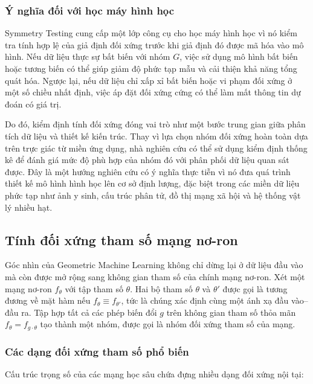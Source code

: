 \subsubsection{Ý nghĩa đối với học máy hình học}

Symmetry Testing cung cấp một lớp công cụ cho học máy hình học vì nó kiểm tra tính hợp lệ của giả định đối xứng trước khi giả định đó được mã hóa vào mô hình. Nếu dữ liệu thực sự bất biến với nhóm $G$, việc sử dụng mô hình bất biến hoặc tương biến có thể giúp giảm độ phức tạp mẫu và cải thiện khả năng tổng quát hóa. Ngược lại, nếu dữ liệu chỉ xấp xỉ bất biến hoặc vi phạm đối xứng ở một số chiều nhất định, việc áp đặt đối xứng cứng có thể làm mất thông tin dự đoán có giá trị.

Do đó, kiểm định tính đối xứng đóng vai trò như một bước trung gian giữa phân tích dữ liệu và thiết kế kiến trúc. Thay vì lựa chọn nhóm đối xứng hoàn toàn dựa trên trực giác từ miền ứng dụng, nhà nghiên cứu có thể sử dụng kiểm định thống kê để đánh giá mức độ phù hợp của nhóm đó với phân phối dữ liệu quan sát được. Đây là một hướng nghiên cứu có ý nghĩa thực tiễn vì nó đưa quá trình thiết kế mô hình hình học lên cơ sở định lượng, đặc biệt trong các miền dữ liệu phức tạp như ảnh y sinh, cấu trúc phân tử, đồ thị mạng xã hội và hệ thống vật lý nhiều hạt.


\subsection{Tính đối xứng tham số mạng nơ-ron}
\label{subsec:parameter-symmetries}

Góc nhìn của Geometric Machine Learning không chỉ dừng lại ở dữ liệu đầu vào mà còn được mở rộng sang không gian tham số của chính mạng nơ-ron. Xét một mạng nơ-ron $f_\theta$ với tập tham số $\theta$. Hai bộ tham số $\theta$ và $\theta'$ được gọi là tương đương về mặt hàm nếu $f_\theta \equiv f_{\theta'}$, tức là chúng xác định cùng một ánh xạ đầu vào--đầu ra. Tập hợp tất cả các phép biến đổi $g$ trên không gian tham số thỏa mãn $f_\theta = f_{g \cdot \theta}$ tạo thành một nhóm, được gọi là nhóm đối xứng tham số của mạng.

\subsubsection{Các dạng đối xứng tham số phổ biến}

Cấu trúc trọng số của các mạng học sâu chứa đựng nhiều dạng đối xứng nội tại:

